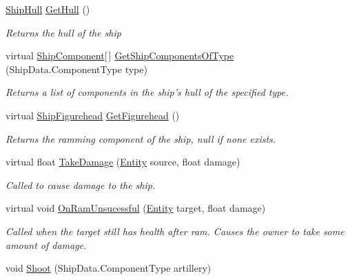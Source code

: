 \begin{DoxyCompactItemize}
\item 
\hyperlink{class_skyrates_1_1_ship_1_1_ship_hull}{Ship\-Hull} \hyperlink{class_skyrates_1_1_entity_1_1_entity_ship_a4924d36536b94a66db8848fa462ffb9b}{Get\-Hull} ()
\begin{DoxyCompactList}\small\item\em Returns the hull of the ship \end{DoxyCompactList}\item 
virtual \hyperlink{class_skyrates_1_1_ship_1_1_ship_component}{Ship\-Component}\mbox{[}$\,$\mbox{]} \hyperlink{class_skyrates_1_1_entity_1_1_entity_ship_afcff893543bdd7f3727747527bbef62d}{Get\-Ship\-Components\-Of\-Type} (Ship\-Data.\-Component\-Type type)
\begin{DoxyCompactList}\small\item\em Returns a list of components in the ship's hull of the specified type. \end{DoxyCompactList}\item 
virtual \hyperlink{class_skyrates_1_1_ship_1_1_ship_figurehead}{Ship\-Figurehead} \hyperlink{class_skyrates_1_1_entity_1_1_entity_ship_a266bd486dd19d986af0580085aaf795d}{Get\-Figurehead} ()
\begin{DoxyCompactList}\small\item\em Returns the ramming component of the ship, null if none exists. \end{DoxyCompactList}\item 
virtual float \hyperlink{class_skyrates_1_1_entity_1_1_entity_ship_a3ad30bc27cf8344c4acbfea78f8ee373}{Take\-Damage} (\hyperlink{class_skyrates_1_1_entity_1_1_entity}{Entity} source, float damage)
\begin{DoxyCompactList}\small\item\em Called to cause damage to the ship. \end{DoxyCompactList}\item 
virtual void \hyperlink{class_skyrates_1_1_entity_1_1_entity_ship_a2e93bc3984f68a3838ec422978b5d152}{On\-Ram\-Unsucessful} (\hyperlink{class_skyrates_1_1_entity_1_1_entity}{Entity} target, float damage)
\begin{DoxyCompactList}\small\item\em Called when the target still has health after ram. Causes the owner to take some amount of damage. \end{DoxyCompactList}\item 
void \hyperlink{class_skyrates_1_1_entity_1_1_entity_ship_ab8b29253f4934d846919a1020d01d5bc}{Shoot} (Ship\-Data.\-Component\-Type artillery)

\end{DoxyCompactItemize}
